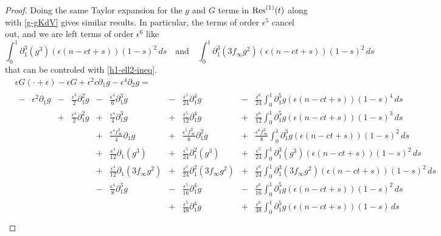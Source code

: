 \begin{proof}
	Doing the same Taylor expansion for the \(g\) and \(G\) terms in \(\mathrm{Res}^{(1)}(t)\) along with \cref{g-gKdV} gives similar results. In particular, the terms of order \(\epsilon^5\) cancel out, and we are left terms of order \(\epsilon^6\) like
	\begin{equation}
		\int_0^1 \partial_1^3(g^3)(\epsilon(n - ct + s)) (1-s)^2 \, ds \quad \text{and} \quad \int_0^1 \partial_1^3(3f_\infty g^2)(\epsilon(n - ct + s)) (1-s)^2 \, ds
	\end{equation}
	that can be controled with \cref{h1-ell2-ineq}.
	\iffalse
	\begin{equation}
		\begin{aligned}
			&\epsilon G(\cdot + \epsilon) - \epsilon G + \epsilon^2c \partial_1 g - \epsilon^4 \partial_2 g  = \\
			&\begin{aligned}
				- & \epsilon^2 \partial_1 g & -&\frac{\epsilon^3} 2 \partial_1^2 g & - &\frac{\epsilon^4} 6 \partial_1^3 g & - & \frac{\epsilon^5}{24} \partial_1^4 g & -&\frac{\epsilon^6} {24} \int_0^1 \partial_1^5 g(\epsilon(n - ct + s)) (1-s)^4 \, ds \\
				& & +&\frac{\epsilon^3} 2 \partial_1^2 g & + &\frac{\epsilon^4} 4\partial_1^3 g &+ & \frac{\epsilon^5}{12} \partial_1^4 g & +&\frac{\epsilon^6} {12} \int_0^1 \partial_1^5 g(\epsilon(n - ct + s)) (1-s)^3 \, ds \\
				& & & & + &\frac{\epsilon^4 f_\infty^2} 4\partial_1 g & + & \frac{\epsilon^5f_\infty^2} 8 \partial_1^2 g & +&\frac{\epsilon^6 f_\infty^2} 8 \int_0^1 \partial_1^3 g(\epsilon(n - ct + s)) (1-s)^2 \, ds \\
				& & & & + &\frac{\epsilon^4} {12}\partial_1 (g^3) & + & \frac{\epsilon^5}{24} \partial_1^2(g^3) & +&\frac{\epsilon^5} {24} \int_0^1 \partial_1^3(g^3)(\epsilon(n - ct + s)) (1-s)^2 \, ds \\
				& & & & + &\frac{\epsilon^4} {12}\partial_1 (3f_\infty g^2) & + & \frac{\epsilon^5}{24}\partial_1^2(3f_\infty g^2) & +&\frac{\epsilon^6} {24} \int_0^1 \partial_1^3(3f_\infty g^2)(\epsilon(n - ct + s)) (1-s)^2 \, ds \\
				& & & & - &\frac{\epsilon^4} {8}\partial_1^3 g & - &  \frac{\epsilon^5}{16} \partial_1^4 g & -&\frac{\epsilon^6} {16} \int_0^1 \partial_1^5g(\epsilon(n - ct + s)) (1-s)^2 \, ds \\ 
				& & & & & & + & \frac{\epsilon^5}{48} \partial_1^4 g & + & \frac{\epsilon^6}{48}\int_0^1 \partial_1^5 g(\epsilon(n-ct+s))(1-s)\, ds \\

\end{aligned}
\end{aligned}
\end{equation}
\end{proof}
